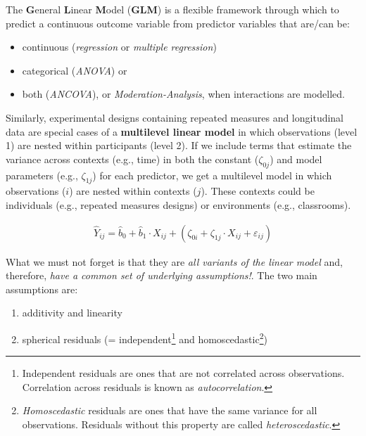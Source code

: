 \documentclass[
]{article}
\providecommand{\tightlist}{%
  \setlength{\itemsep}{0pt}\setlength{\parskip}{0pt}}
\begin{document}
The \textbf{G}eneral \textbf{L}inear \textbf{M}odel (\textbf{GLM}) is a flexible framework through which to predict a continuous outcome variable from predictor variables that are/can be:

\begin{itemize}
\tightlist
\item
  continuous (\emph{regression} or \emph{multiple regression})
\item
  categorical (\emph{ANOVA}) or
\item
  both (\emph{ANCOVA}), or \emph{Moderation-Analysis}, when interactions are modelled.
\end{itemize}

Similarly, experimental designs containing repeated measures and longitudinal data are special cases of a \textbf{multilevel linear model} in which observations (level 1) are nested within participants (level 2). If we include terms that estimate the variance across contexts (e.g., time) in both the constant (\(\zeta_{0j}\)) and model parameters (e.g., \(\zeta_{1j}\)) for each predictor, we get a multilevel model in which observations (\(i\)) are nested within contexts (\(j\)). These contexts could be individuals (e.g., repeated measures designs) or environments (e.g., classrooms).

\[\begin{array}{c}
  \hat{Y}_{ij} = \hat{b}_0 + \hat{b}_1 \cdot X_{ij} + (\zeta_{0i} + \zeta_{1j} \cdot X_{ij} + \varepsilon_{ij})
\end{array}\]

What we must not forget is that they are \emph{all variants of the linear model} and, therefore, \emph{have a common set of underlying assumptions!}. The two main assumptions are:

\begin{enumerate}
\def\labelenumi{\arabic{enumi}.}
\tightlist
\item
  additivity and linearity
\item
  spherical residuals (= independent\footnote{ Independent residuals are ones that are not correlated across observations. Correlation across residuals is known as \emph{autocorrelation}.} and homoscedastic\footnote{ \emph{Homoscedastic} residuals are ones that have the same variance for all observations. Residuals without this property are called \emph{heteroscedastic}.})
\end{enumerate}
\end{document}
